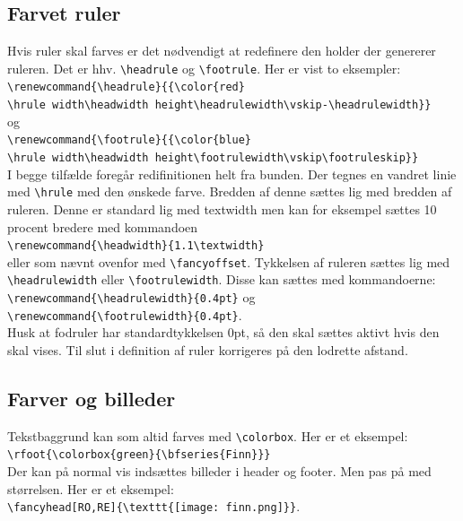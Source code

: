 \documentclass{article}
\begin{document}
\subsection{Farvet ruler}
Hvis ruler skal farves er det nødvendigt at redefinere den holder der genererer ruleren. Det er hhv. \verb"\headrule" og \verb"\footrule". Her er vist to eksempler:\\
\verb"\renewcommand{\headrule}{{\color{red}"\\
\verb"\hrule width\headwidth height\headrulewidth\vskip-\headrulewidth}}"\\
og\\
\verb"\renewcommand{\footrule}{{\color{blue}"\\
\verb"\hrule width\headwidth height\footrulewidth\vskip\footruleskip}}"\\
I begge tilfælde foregår redifinitionen helt fra bunden. Der tegnes en vandret linie med \verb"\hrule" med den ønskede farve. Bredden af denne sættes lig med bredden af ruleren. Denne er standard lig med textwidth men kan for eksempel sættes 10 procent bredere med kommandoen\\ \verb"\renewcommand{\headwidth}{1.1\textwidth}" \\eller som nævnt ovenfor med \verb"\fancyoffset". Tykkelsen af ruleren sættes lig med \verb"\headrulewidth" eller \verb"\footrulewidth". Disse kan sættes med kommandoerne:\\ \verb"\renewcommand{\headrulewidth}{0.4pt}" og\\ \verb"\renewcommand{\footrulewidth}{0.4pt}".\\ Husk at fodruler har standardtykkelsen 0pt, så den skal sættes aktivt hvis den skal vises. Til slut i definition af ruler korrigeres på den lodrette afstand.
\subsection{Farver og billeder}
Tekstbaggrund kan som altid farves med \verb"\colorbox". Her er et eksempel:\\
\verb"\rfoot{\colorbox{green}{\bfseries{Finn}}}"\\
Der kan på normal vis indsættes billeder i header og footer. Men pas på med størrelsen. Her er et eksempel:\\
\verb"\fancyhead[RO,RE]{\texttt{[image: finn.png]}}".
\end{document}
